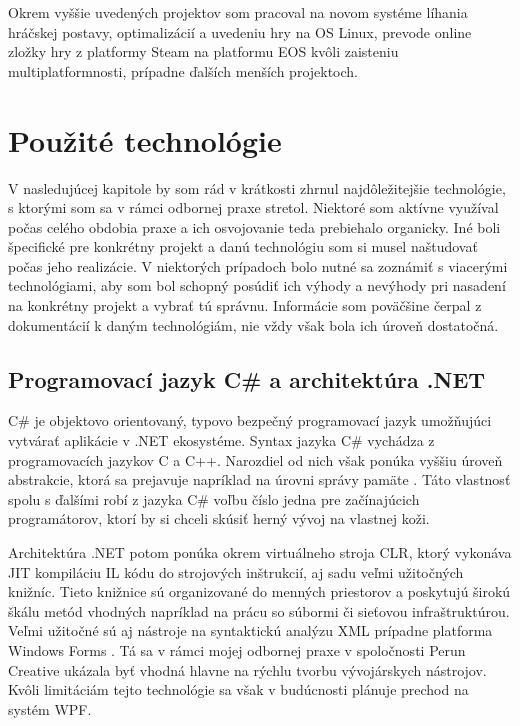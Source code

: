 \documentclass[slovak, bachelorpractice]{diploma}
\begin{document}
Okrem vyššie uvedených projektov som pracoval na novom systéme líhania hráčskej postavy, optimalizácií a uvedeniu hry na OS Linux, prevode online zložky hry z platformy Steam na platformu EOS kvôli zaisteniu multiplatformnosti, prípadne ďalších menších projektoch.

\chapter{Použité technológie}
\label{sec:Tech}
V nasledujúcej kapitole by som rád v krátkosti zhrnul najdôležitejšie technológie, s ktorými som sa v rámci odbornej praxe stretol. Niektoré som aktívne využíval počas celého obdobia praxe a ich osvojovanie teda prebiehalo organicky. Iné boli špecifické pre konkrétny projekt a danú technológiu som si musel naštudovať počas jeho realizácie. V niektorých prípadoch bolo nutné sa zoznámiť s viacerými technológiami, aby som bol schopný posúdiť ich výhody a nevýhody pri nasadení na konkrétny projekt a vybrať tú správnu. Informácie som poväčšine čerpal z dokumentácií k daným technológiám, nie vždy však bola ich úroveň dostatočná.

\section{Programovací jazyk C\# a architektúra .NET}
\label{sec:CsharpDotNet}
C\# je objektovo orientovaný, typovo bezpečný programovací jazyk umožňujúci vytvárať aplikácie v .NET ekosystéme. Syntax jazyka C\# vychádza z programovacích jazykov C a C++. Narozdiel od nich však ponúka vyššiu úroveň abstrakcie, ktorá sa prejavuje napríklad na úrovni správy pamäte \cite{CSharpLang}. Táto vlastnosť spolu s ďalšími robí z jazyka C\#  voľbu číslo jedna pre začínajúcich programátorov, ktorí by si chceli skúsiť herný vývoj na vlastnej koži.

Architektúra .NET potom ponúka okrem virtuálneho stroja CLR, ktorý vykonáva JIT kompiláciu IL kódu do strojových inštrukcií, aj sadu veľmi užitočných knižníc. Tieto knižnice sú organizované do menných priestorov a poskytujú širokú škálu metód vhodných napríklad na prácu so súbormi či sieťovou infraštruktúrou. Veľmi užitočné sú aj nástroje na syntaktickú analýzu XML prípadne platforma Windows Forms \cite{CSharpLang}. Tá sa v rámci mojej odbornej praxe v spoločnosti Perun Creative ukázala byť vhodná hlavne na rýchlu tvorbu vývojárskych nástrojov. Kvôli limitáciám tejto technológie sa však v budúcnosti plánuje prechod na systém WPF.
\end{document}
